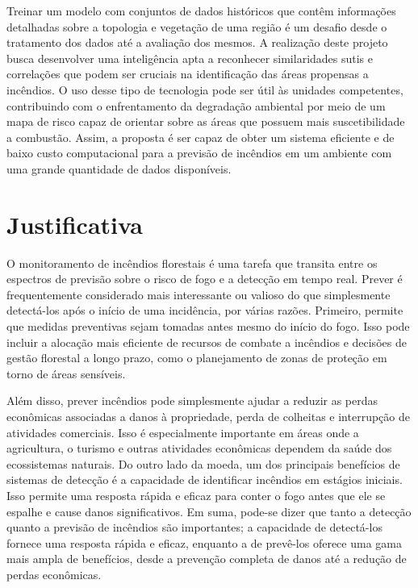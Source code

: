 Treinar um modelo com conjuntos de dados históricos que contêm informações detalhadas sobre a topologia e vegetação de uma região é um desafio desde o tratamento dos dados até a avaliação dos mesmos. A realização deste projeto busca desenvolver uma inteligência apta a reconhecer similaridades sutis e correlações que podem ser cruciais na identificação das áreas propensas a incêndios. O uso desse tipo de tecnologia pode ser útil às unidades competentes, contribuindo com o enfrentamento da degradação ambiental por meio de um mapa de risco capaz de orientar sobre as áreas que possuem mais suscetibilidade a combustão. Assim, a proposta é ser capaz de obter um sistema eficiente e de baixo custo computacional para a previsão de incêndios em um ambiente com uma grande quantidade de dados disponíveis.

\section{Justificativa}

O monitoramento de incêndios florestais é uma tarefa que transita entre os espectros de previsão sobre o risco de fogo e a detecção em tempo real. Prever é frequentemente considerado mais interessante ou valioso do que simplesmente detectá-los após o início de uma incidência, por várias razões. Primeiro, permite que medidas preventivas sejam tomadas antes mesmo do início do fogo. Isso pode incluir a alocação mais eficiente de recursos de combate a incêndios e decisões de gestão florestal a longo prazo, como o planejamento de zonas de proteção em torno de áreas sensíveis.

Além disso, prever incêndios pode simplesmente ajudar a reduzir as perdas econômicas associadas a danos à propriedade, perda de colheitas e interrupção de atividades comerciais. Isso é especialmente importante em áreas onde a agricultura, o turismo e outras atividades econômicas dependem da saúde dos ecossistemas naturais. Do outro lado da moeda, um dos principais benefícios de sistemas de detecção é a capacidade de identificar incêndios em estágios iniciais. Isso permite uma resposta rápida e eficaz para conter o fogo antes que ele se espalhe e cause danos significativos. Em suma, pode-se dizer que tanto a detecção quanto a previsão de incêndios são importantes; a capacidade de detectá-los fornece uma resposta rápida e eficaz, enquanto a de prevê-los oferece uma gama mais ampla de benefícios, desde a prevenção completa de danos até a redução de perdas econômicas.

